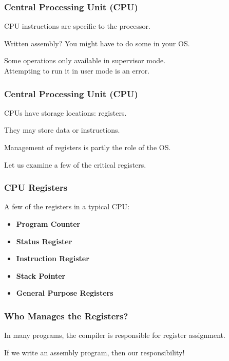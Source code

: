 \begin{frame}
\frametitle{Central Processing Unit (CPU)}


CPU instructions are specific to the processor.

Written assembly? You might have to do some in your OS.

Some operations only available in supervisor mode.\\
\quad Attempting to run it in user mode is an error.


\end{frame}

\begin{frame}
\frametitle{Central Processing Unit (CPU)}
CPUs have storage locations: \alert{registers}.

They may store data or instructions.

Management of registers is partly the role of the OS.

Let us examine a few of the critical registers.

\end{frame}

\begin{frame}
\frametitle{CPU Registers}

A few of the registers in a typical CPU:

\begin{itemize}
	\item \textbf{Program Counter}
	\item \textbf{Status Register}
	\item \textbf{Instruction Register}
	\item \textbf{Stack Pointer}
	\item \textbf{General Purpose Registers}
\end{itemize}

\end{frame}

\begin{frame}
\frametitle{Who Manages the Registers?}

In many programs, the compiler is responsible for register assignment.

If we write an assembly program, then our responsibility!

\end{frame}

